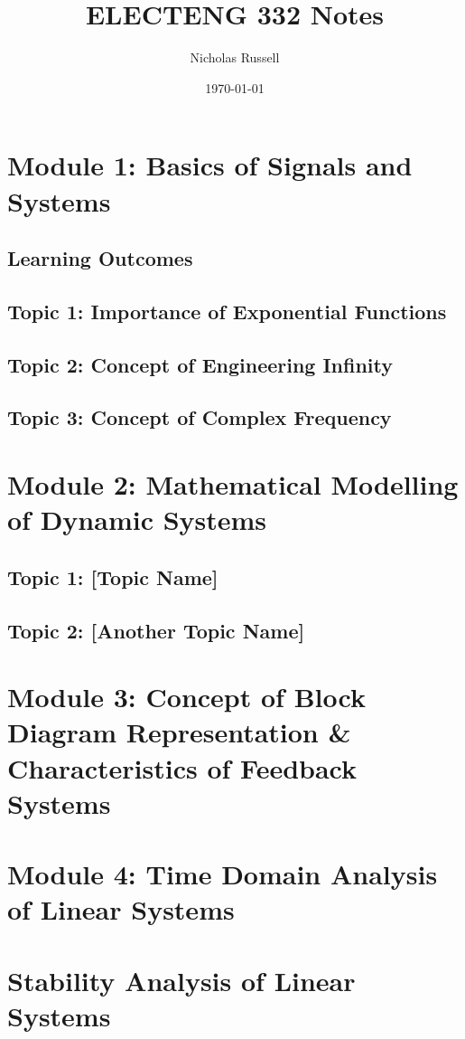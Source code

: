 \documentclass[12pt]{report}
\title{ELECTENG 332 Notes}
\author{Nicholas Russell}
\date{\today}
\begin{document}
\maketitle
\tableofcontents
\newpage

\chapter{Module 1: Basics of Signals and Systems}

\section{Learning Outcomes}


\section{Topic 1: Importance of Exponential Functions}


\section{Topic 2: Concept of Engineering Infinity}


\section{Topic 3: Concept of Complex Frequency}


\clearpage

\chapter{Module 2: Mathematical Modelling of Dynamic Systems}


\section{Topic 1: [Topic Name]}



\section{Topic 2: [Another Topic Name]}


\clearpage

\chapter{Module 3: Concept of Block Diagram Representation \&
Characteristics of Feedback Systems}

\clearpage

\chapter{Module 4: Time Domain Analysis of Linear Systems}

\clearpage

\chapter{Stability Analysis of Linear Systems}
\end{document}

